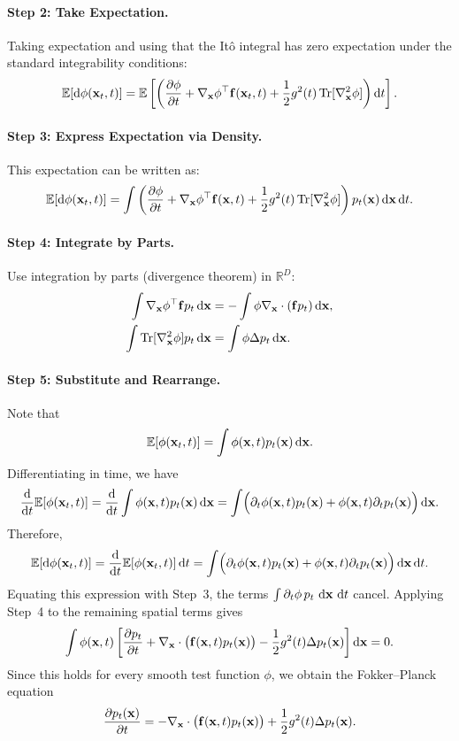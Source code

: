 \paragraph{Step 2: Take Expectation.}
Taking expectation and using that the It\^o integral has zero expectation
under the standard integrability conditions:
\[
\mathbb{E}[\mathop{}\!\mathrm{d} \phi({\mathbf{x}}_t, t)] = \mathbb{E} \left[ \left( \frac{\partial \phi}{\partial t} + \nabla_{{\mathbf{x}}} \phi^\top {\mathbf{f}}({\mathbf{x}}_t, t) + \frac{1}{2} g^2(t) \operatorname{Tr}[\nabla_{{\mathbf{x}}}^2 \phi] \right) \mathop{}\!\mathrm{d} t \right].
\]
\paragraph{Step 3: Express Expectation via Density.}
This expectation can be written as:
\[
\mathbb{E}[\mathop{}\!\mathrm{d} \phi({\mathbf{x}}_t, t)] = \int \left( \frac{\partial \phi}{\partial t} + \nabla_{{\mathbf{x}}} \phi^\top {\mathbf{f}}({\mathbf{x}}, t) + \frac{1}{2} g^2(t) \operatorname{Tr}[\nabla_{{\mathbf{x}}}^2 \phi] \right) p_t({\mathbf{x}}) \mathop{}\!\mathrm{d} {\mathbf{x}} \mathop{}\!\mathrm{d} t.
\]
\paragraph{Step 4: Integrate by Parts.}
Use integration by parts (divergence theorem) in $\mathbb{R}^D$:
\begin{align*}
    \int \nabla_{{\mathbf{x}}} \phi^\top {\mathbf{f}} p_t \mathop{}\!\mathrm{d} {\mathbf{x}} &= -\int \phi \nabla_{{\mathbf{x}}} \cdot ({\mathbf{f}} p_t) \mathop{}\!\mathrm{d} {\mathbf{x}}, \\
    \int \operatorname{Tr}[\nabla_{{\mathbf{x}}}^2 \phi] p_t  \mathop{}\!\mathrm{d} {\mathbf{x}} &= \int \phi \Delta p_t \mathop{}\!\mathrm{d} {\mathbf{x}}.
\end{align*}
\paragraph{Step 5: Substitute and Rearrange.}
Note that
\[
\mathbb{E}[\phi({\mathbf{x}}_t,t)] = \int \phi({\mathbf{x}},t) p_t({\mathbf{x}}) \mathop{}\!\mathrm{d}{\mathbf{x}}.
\]
Differentiating in time, we have
\[
\frac{\mathop{}\!\mathrm{d}}{\mathop{}\!\mathrm{d} t}\mathbb{E}[\phi({\mathbf{x}}_t,t)]
= \frac{\mathop{}\!\mathrm{d}}{\mathop{}\!\mathrm{d} t}\int \phi({\mathbf{x}},t) p_t({\mathbf{x}}) \mathop{}\!\mathrm{d}{\mathbf{x}}
= \int\Bigl(\partial_t\phi({\mathbf{x}},t) p_t({\mathbf{x}}) + \phi({\mathbf{x}},t) \partial_t p_t({\mathbf{x}})\Bigr)\mathop{}\!\mathrm{d}{\mathbf{x}}.
\]
Therefore,
\[
\mathbb{E}[\mathop{}\!\mathrm{d} \phi({\mathbf{x}}_t,t)]
= \frac{\mathop{}\!\mathrm{d}}{\mathop{}\!\mathrm{d} t}\mathbb{E}[\phi({\mathbf{x}}_t,t)] \mathop{}\!\mathrm{d} t
= \int\Bigl(\partial_t\phi({\mathbf{x}},t) p_t({\mathbf{x}}) + \phi({\mathbf{x}},t) \partial_t p_t({\mathbf{x}})\Bigr)\mathop{}\!\mathrm{d}{\mathbf{x}} \mathop{}\!\mathrm{d} t.
\]
Equating this expression with Step~3, the terms
$\int \partial_t\phi\,p_t\,\mathop{}\!\mathrm{d}{\mathbf{x}}\,\mathop{}\!\mathrm{d} t$ cancel. Applying Step~4 to
the remaining spatial terms gives
\[
\int
\phi({\mathbf{x}},t)
\left[
\frac{\partial p_t}{\partial t}
+
\nabla_{{\mathbf{x}}}\cdot\bigl({\mathbf{f}}({\mathbf{x}},t)p_t({\mathbf{x}})\bigr)
-
\frac{1}{2}g^2(t)\Delta p_t({\mathbf{x}})
\right]
\mathop{}\!\mathrm{d}{\mathbf{x}}
=
0.
\]
Since this holds for every smooth test function $\phi$, we obtain the
Fokker--Planck equation
\[
\frac{\partial p_t({\mathbf{x}})}{\partial t}
=
-\nabla_{{\mathbf{x}}}\cdot\bigl({\mathbf{f}}({\mathbf{x}},t)p_t({\mathbf{x}})\bigr)
+
\frac{1}{2}g^2(t)\Delta p_t({\mathbf{x}}).
\]


